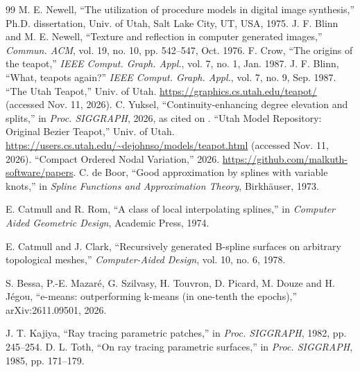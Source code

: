 \documentclass[journal]{IEEEtran}
\begin{document}
\begin{thebibliography}{99}
\scriptsize
{}
M. E. Newell, ``The utilization of procedure models in digital image
synthesis,'' Ph.D. dissertation, Univ. of Utah, Salt Lake City, UT, USA,
1975.
J. F. Blinn and M. E. Newell, ``Texture and reflection in computer
generated images,'' \emph{Commun. ACM}, vol. 19, no. 10, pp. 542--547,
Oct. 1976.
F. Crow, ``The origins of the teapot,'' \emph{IEEE Comput. Graph. Appl.},
vol. 7, no. 1, Jan. 1987.
J. F. Blinn, ``What, teapots again?'' \emph{IEEE Comput. Graph. Appl.},
vol. 7, no. 9, Sep. 1987.
``The Utah Teapot,'' Univ. of Utah.
\url{https://graphics.cs.utah.edu/teapot/} (accessed Nov. 11, 2026).
C. Yuksel, ``Continuity-enhancing degree elevation and splits,'' in
\emph{Proc. SIGGRAPH}, 2026, as cited on \cite{utahpage}.
``Utah Model Repository: Original Bezier Teapot,'' Univ. of Utah.
\url{https://users.cs.utah.edu/~dejohnso/models/teapot.html} (accessed
Nov. 11, 2026).
``Compact Ordered Nodal Variation,'' 2026.
\url{https://github.com/malkuth-software/papers}.
C. de Boor, ``Good approximation by splines with variable knots,'' in
\emph{Spline Functions and Approximation Theory}, Birkh\"auser, 1973.

E. Catmull and R. Rom, ``A class of local interpolating splines,'' in
\emph{Computer Aided Geometric Design}, Academic Press, 1974.

E. Catmull and J. Clark, ``Recursively generated B-spline surfaces on
arbitrary topological meshes,'' \emph{Computer-Aided Design}, vol. 10,
no. 6, 1978.

S. Bessa, P.-E. Mazar\'e, G. Szilvasy, H. Touvron, D. Picard, M. Douze
and H. J\'egou, ``e-means: outperforming k-means (in one-tenth the
epochs),'' arXiv:2611.09501, 2026.

J. T. Kajiya, ``Ray tracing parametric patches,'' in \emph{Proc.
SIGGRAPH}, 1982, pp. 245--254.
D. L. Toth, ``On ray tracing parametric surfaces,'' in \emph{Proc.
SIGGRAPH}, 1985, pp. 171--179.
\end{thebibliography}
\end{document}
